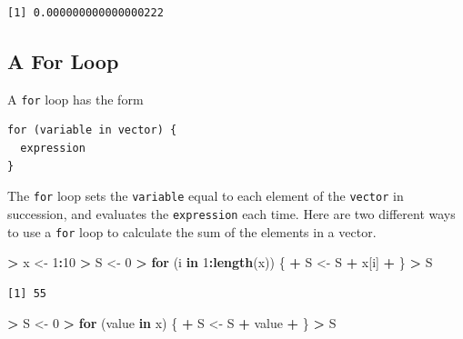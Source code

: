 \documentclass[]{krantz}
\makeatletter
\newenvironment{Shaded}{\begin{snugshade}}{\end{snugshade}}
\newcommand{\ControlFlowTok}[1]{\textcolor[rgb]{0.27,0.27,0.27}{\textbf{#1}}}
\newcommand{\DecValTok}[1]{\textcolor[rgb]{0.06,0.06,0.06}{#1}}
\newcommand{\KeywordTok}[1]{\textcolor[rgb]{0.27,0.27,0.27}{\textbf{#1}}}
\newcommand{\NormalTok}[1]{#1}
\newcommand{\OperatorTok}[1]{\textcolor[rgb]{0.43,0.43,0.43}{\textbf{#1}}}
\newcommand{\StringTok}[1]{\textcolor[rgb]{0.5,0.5,0.5}{#1}}
\newenvironment{kframe}{%
\medskip{}
\setlength{\fboxsep}{.8em}
 \def\at@end@of@kframe{}%
 \ifinner\ifhmode%
  \def\at@end@of@kframe{\end{minipage}}%
  \begin{minipage}{\columnwidth}%
 \fi\fi%
 \def\FrameCommand##1{\hskip\@totalleftmargin \hskip-\fboxsep
 \colorbox{shadecolor}{##1}\hskip-\fboxsep
     \hskip-\linewidth \hskip-\@totalleftmargin \hskip\columnwidth}%
 \MakeFramed {\advance\hsize-\width
   \@totalleftmargin\z@ \linewidth\hsize
   \@setminipage}}%
 {\par\unskip\endMakeFramed%
 \at@end@of@kframe}
\renewenvironment{Shaded}{\begin{kframe}}{\end{kframe}}
\makeatother
\begin{document}
\begin{verbatim}
[1] 0.000000000000000222
\end{verbatim}

\hypertarget{a-for-loop}{%
\subsection{A For Loop}\label{a-for-loop}}

A \texttt{for} loop has the form

\begin{verbatim}
for (variable in vector) {
  expression
}
\end{verbatim}

The \texttt{for} loop sets the \texttt{variable} equal to each element of the \texttt{vector} in succession, and evaluates the \texttt{expression} each time. Here are two different ways to use a \texttt{for} loop to calculate the sum of the elements in a vector.

\begin{Shaded}
\begin{Highlighting}[]
\OperatorTok{>}\StringTok{ }\NormalTok{x <-}\StringTok{ }\DecValTok{1}\OperatorTok{:}\DecValTok{10}
\OperatorTok{>}\StringTok{ }\NormalTok{S <-}\StringTok{ }\DecValTok{0}
\OperatorTok{>}\StringTok{ }\ControlFlowTok{for}\NormalTok{ (i }\ControlFlowTok{in} \DecValTok{1}\OperatorTok{:}\KeywordTok{length}\NormalTok{(x)) \{}
\OperatorTok{+}\StringTok{   }\NormalTok{S <-}\StringTok{ }\NormalTok{S }\OperatorTok{+}\StringTok{ }\NormalTok{x[i]}
\OperatorTok{+}\StringTok{ }\NormalTok{\}}
\OperatorTok{>}\StringTok{ }\NormalTok{S}
\end{Highlighting}
\end{Shaded}

\begin{verbatim}
[1] 55
\end{verbatim}

\begin{Shaded}
\begin{Highlighting}[]
\OperatorTok{>}\StringTok{ }\NormalTok{S <-}\StringTok{ }\DecValTok{0}
\OperatorTok{>}\StringTok{ }\ControlFlowTok{for}\NormalTok{ (value }\ControlFlowTok{in}\NormalTok{ x) \{}
\OperatorTok{+}\StringTok{   }\NormalTok{S <-}\StringTok{ }\NormalTok{S }\OperatorTok{+}\StringTok{ }\NormalTok{value}
\OperatorTok{+}\StringTok{ }\NormalTok{\}}
\OperatorTok{>}\StringTok{ }\NormalTok{S}
\end{Highlighting}
\end{Shaded}
\end{document}
